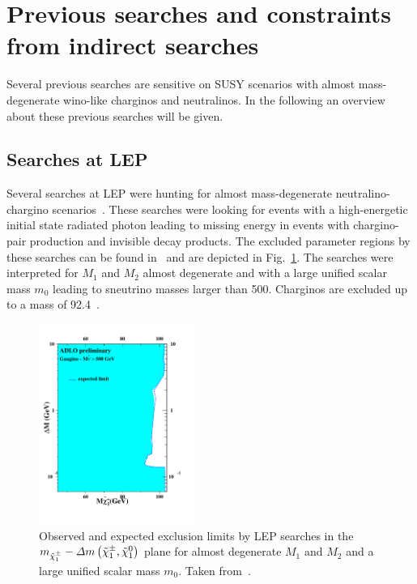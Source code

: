 \section{Previous searches and constraints from indirect searches}

Several previous searches are sensitive on SUSY scenarios with almost mass-degenerate wino-like charginos and neutralinos.
In the following an overview about these previous searches will be given.

\subsection*{Searches at LEP}
Several searches at LEP were hunting for almost mass-degenerate neutralino-chargino scenarios~\cite{bib:PreviousSearches_ALEPH,bib:PreviousSearches_OPAL,bib:PreviousSearches_DELPHI_2003,bib:PreviousSearches_DELPHI}.
These searches were looking for events with a high-energetic initial state radiated photon leading to missing energy in events with chargino-pair production and invisible decay products.
The excluded parameter regions by these searches can be found in~\cite{bib:LEP:SUSY_results} and are depicted in Fig.~\ref{fig:LEP}.
The searches were interpreted for $M_1$ and $M_2$ almost degenerate and with a large unified scalar mass $m_0$ leading to sneutrino masses larger than 500\gev. 
Charginos are excluded up to a mass of 92.4\gev~\cite{bib:LEP:SUSY_results}.
\begin{figure}[!h]
  \centering
      \includegraphics[width=0.45\textwidth]{figures/theory/mass_adlo_gaug_1.pdf}
  \caption{Observed and expected exclusion limits by LEP searches in the $m_{\tilde{\chi}^{\pm}_{1}}-\Delta m \left( \tilde{\chi}^{\pm}_{1}, \tilde{\chi}^{0}_{1} \right)$ plane for almost degenerate $M_1$ and $M_2$ and a large unified scalar mass $m_0$. Taken from~\cite{bib:LEP:SUSY_results}.}  
  \label{fig:LEP}
\end{figure}

